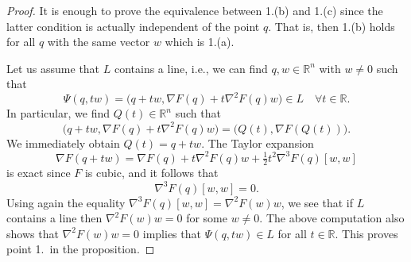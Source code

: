 \documentclass[12pt]{article}
\newcommand{\R}{{\mathbb R}}
\begin{document}
\begin{proof}
It is enough to prove the equivalence between 1.(b) and 1.(c) since the latter condition is actually independent of the point $q$. That is, then 1.(b) holds for all $q$ with the same vector $w$ which is 1.(a).

Let us assume that $L$ contains a line, i.e., we can find $q,w\in\R^n$ with $w\neq0$ such that
\begin{equation}\nonumber
\Psi(q,tw)=\big(q+tw,\nabla F(q)+t\nabla^2F(q)w\big)\in L\quad\forall t\in\R.
\end{equation}
In particular, we find $Q(t)\in\R^n$ such that
\begin{equation}\nonumber
\big(q+tw,\nabla F(q)+t\nabla^2F(q)w\big)=\big(Q(t),\nabla F(Q(t))\big).
\end{equation}
We immediately obtain $Q(t)=q+tw$. The Taylor expansion 
\begin{equation}\nonumber
\nabla F(q+tw)=\nabla F(q) +t \nabla^2F(q)w+\tfrac12t^2\nabla^3F(q)[w,w]
\end{equation}
is exact since $F$ is cubic, and it follows that
\begin{equation}\nonumber
\nabla^3F(q)[w,w]=0.
\end{equation}
Using again the equality $\nabla^3F(q)[w,w]=\nabla^2F(w)w$, we see that if $L$ contains a line then $\nabla^2F(w)w=0$ for some $w\neq0$. The above computation also shows that $\nabla^2F(w)w=0$ implies that $\Psi(q,tw)\in L$ for all $t\in\R$. This proves point 1.~in the proposition.


\end{proof}
\end{document}
